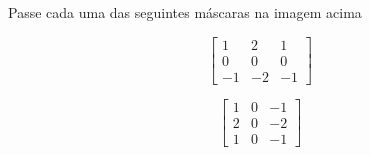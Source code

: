 \documentclass[12pt]{article}
\begin{document}
Passe cada uma das seguintes máscaras na imagem acima

\[
\begin{bmatrix}
 1 &  2 &  1\\
 0 &  0 &  0\\
-1 & -2 & -1
\end{bmatrix}
\]

\[
\begin{bmatrix}
 1 &  0 & -1\\
 2 &  0 & -2\\
 1 &  0 & -1
\end{bmatrix}
\]
\end{document}
